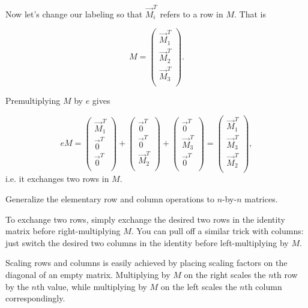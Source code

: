 \documentclass[../group-theory-in-a-nutshell-for-physicists.tex]{subfiles}
\begin{document}
\begin{questions}
\begin{solution}
Now let's change our labeling so that ${\overrightarrow{M}}_{i}^{T}$
refers to a row in $M$. That is

\[
M = \begin{pmatrix}
{\overrightarrow{M}}_{1}^{T} \\
{\overrightarrow{M}}_{2}^{T} \\
{\overrightarrow{M}}_{3}^{T} \\
\end{pmatrix}.
\]

Premultiplying $M$ by $e$ gives

\[
eM = \begin{pmatrix}
{\overrightarrow{M}}_{1}^{T} \\
{\overrightarrow{0}}^{T} \\
{\overrightarrow{0}}^{T} \\
\end{pmatrix} + \begin{pmatrix}
{\overrightarrow{0}}^{T} \\
{\overrightarrow{0}}^{T} \\
{\overrightarrow{M}}_{2}^{T} \\
\end{pmatrix} + \begin{pmatrix}
{\overrightarrow{0}}^{T} \\
{\overrightarrow{M}}_{3}^{T} \\
{\overrightarrow{0}}^{T} \\
\end{pmatrix} = \begin{pmatrix}
{\overrightarrow{M}}_{1}^{T} \\
{\overrightarrow{M}}_{3}^{T} \\
{\overrightarrow{M}}_{2}^{T} \\
\end{pmatrix},
\]
i.e. it exchanges two rows in $M$.
\end{solution}

\question Generalize the elementary row and column operations to \(n\)-by-\(n\)
matrices.

\begin{solution}
To exchange two rows, simply exchange the desired two rows in the
identity matrix before right-multiplying $M$. You can pull off a
similar trick with columns: just switch the desired two columns in the
identity before left-multiplying by $M$.

Scaling rows and columns is easily achieved by placing scaling factors
on the diagonal of an empty matrix. Multiplying by $M$ on the right
scales the $n$th row by the $n$th value, while multiplying by $M$
on the left scales the $n$th column correspondingly.


\end{solution}
\end{questions}
\end{document}
